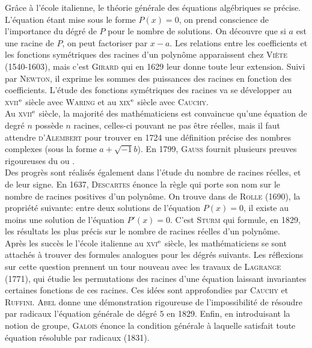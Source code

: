 {Grâce à l'école italienne, le théorie générale des équations algébriques se précise. L'équation étant mise sous le forme $P(x) = 0$, on prend conscience de l'importance du dégré de $P$ pour le nombre de solutions. On découvre que si $a$ est une racine de $P$, on peut factoriser par $x-a$. Les relations entre les coefficients et les fonctions symétriques des racines d'un polynôme apparaissent chez \textsc{Viète} (1540-1603), mais c'est \textsc{Girard} qui en 1629 leur donne toute leur extension. Suivi par \textsc{Newton}, il exprime les sommes des puissances des racines en fonction des coefficients. L'étude des fonctions symétriques des racines va se développer au \textsc{xvii}$^{\mathrm{e}}$ siècle avec \textsc{Waring} et au \textsc{xix}$^{\mathrm{e}}$ siècle avec \textsc{Cauchy}. \\
Au \textsc{xvii}$^{\mathrm{e}}$ siècle, la majorité des mathématiciens est convaincue qu'une équation de degré $n$ possède $n$ racines, celles-ci pouvant ne pas être réelles, mais il faut attendre \textsc{d'Alembert} pour trouver en 1724 une définition précise des nombres complexes (sous la forme $a + \sqrt{-1} b$). En 1799, \textsc{Gauss} fournit plusieurs preuves rigoureuses du  ou . \\
Des progrès sont réalisés également dans l'étude du nombre de racines réelles, et de leur signe. En 1637, \textsc{Descartes} énonce la règle qui porte son nom sur le nombre de racines positives d'un polynôme. On trouve dans  de \textsc{Rolle} (1690), la propriété suivante: entre deux solutions de l'équation $P(x)=0$, il existe au moins une solution de l'équation $P'(x)=0$. C'est \textsc{Sturm} qui formule, en 1829, les résultats les plus précis sur le nombre de racines réelles d'un polynôme. \\
Après les succès le l'école italienne au \textsc{xvi}$^{\mathrm{e}}$ siècle, les mathématiciens se sont attachés à trouver des formules analogues pour les dégrés suivants. Les réflexions sur cette question prennent un tour nouveau avec les travaux de \textsc{Lagrange} (1771), qui étudie les permutations des racines d'une équation laissant invariantes certaines fonctions de ces racines. Ces idées sont approfondies par \textsc{Cauchy} et \textsc{Ruffini}. \textsc{Abel} donne une démonstration rigoureuse de l'impossibilité de résoudre par radicaux l'équation générale de dégré $5$ en 1829. Enfin, en introduisant la notion de groupe, \textsc{Galois} énonce la condition générale à laquelle satisfait toute équation résoluble par radicaux (1831). \\
}
